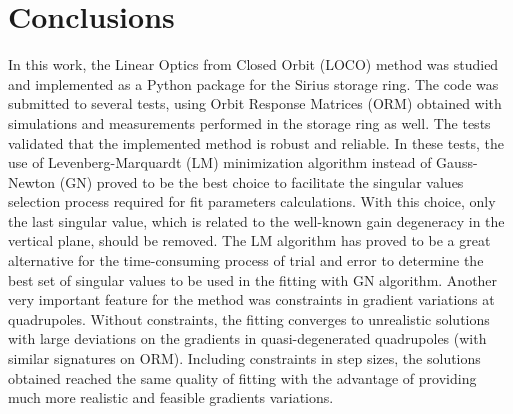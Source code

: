 \chapter*[Conclusions]{Conclusions}

    In this work, the Linear Optics from Closed Orbit (LOCO) method was studied and implemented as a Python package for the Sirius storage ring. The code was submitted to several tests, using Orbit Response Matrices (ORM) obtained with simulations and measurements performed in the storage ring as well. The tests validated that the implemented method is robust and reliable. In these tests, the use of Levenberg-Marquardt (LM) minimization algorithm instead of Gauss-Newton (GN) proved to be the best choice to facilitate the singular values selection process required for fit parameters calculations. With this choice, only the last singular value, which is related to the well-known gain degeneracy in the vertical plane, should be removed. The LM algorithm has proved to be a great alternative for the time-consuming process of trial and error to determine the best set of singular values to be used in the fitting with GN algorithm. Another very important feature for the method was constraints in gradient variations at quadrupoles. Without constraints, the fitting converges to unrealistic solutions with large deviations on the gradients in quasi-degenerated quadrupoles (with similar signatures on ORM). Including constraints in step sizes, the solutions obtained reached the same quality of fitting with the advantage of providing much more realistic and feasible gradients variations.
    
